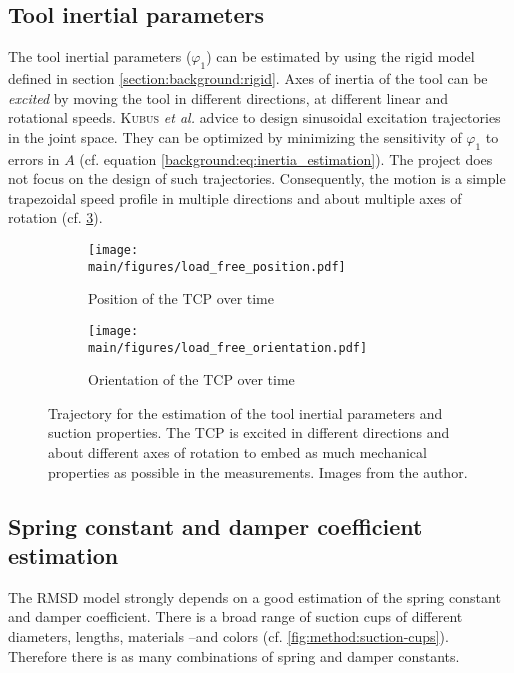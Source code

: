 \documentclass[/home/francois/latex/report/main.tex]{subfiles}
\begin{document}
\subsection{Tool inertial parameters}

The tool inertial parameters ($\varphi_1$) can be estimated by using the rigid model defined in section \ref{section:background:rigid}. Axes of inertia of the tool can be \textit{excited} by moving the tool in different directions, at different linear and rotational speeds. \textsc{Kubus} \textit{et al.} \cite{Kubus2008} advice to design sinusoidal excitation trajectories in the joint space. They can be optimized by minimizing the sensitivity of $\varphi_1$ to errors in $A$ (cf. equation \ref{background:eq:inertia_estimation}). The project does not focus on the design of such trajectories. Consequently, the motion is a simple trapezoidal speed profile in multiple directions and about multiple axes of rotation (cf. \ref{fig:method:trajectory}).

\begin{figure}[H]
\centering
\begin{subfigure}{\textwidth}
\centering
\texttt{[image: \\main/figures/load\_free\_position.pdf]}
\caption{Position of the \ac{TCP} over time}
\label{fig:method:position}
\end{subfigure}
\begin{subfigure}{\textwidth}
\centering
\texttt{[image: \\main/figures/load\_free\_orientation.pdf]}
\caption{Orientation of the \ac{TCP} over time}
\label{fig:method:orientation}
\end{subfigure}
\caption{Trajectory for the estimation of the tool inertial parameters and suction properties. The \ac{TCP} is excited in different directions and about different axes of rotation to embed as much mechanical properties as possible in the measurements. Images from the author.}
\label{fig:method:trajectory}
\end{figure}

\subsection{Spring constant and damper coefficient estimation}

The \ac{RMSD} model strongly depends on a good estimation of the spring constant and damper coefficient. There is a broad range of suction cups of different diameters, lengths, materials –and colors (cf. \ref{fig:method:suction-cups}). Therefore there is as many combinations of spring and damper constants.
\end{document}
